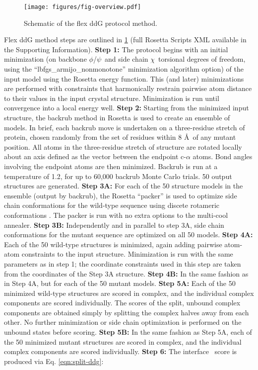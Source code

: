 \begin{figure}
  \centering
  \texttt{[image: figures/fig-overview.pdf]}
    \caption[]{
      Schematic of the flex ddG protocol method.
  } \label{fig:figure-overview}
\end{figure}

Flex ddG method steps are outlined in \cref{fig:figure-overview} (full Rosetta Scripts XML available in the Supporting Information).
\textbf{Step 1:} The protocol begins with an initial minimization (on backbone $\phi$/$\psi$\ and side chain $\chi$\ torsional degrees of freedom, using the ``lbfgs\_armijo\_nonmonotone'' minimization algorithm option) of the input model using the Rosetta energy function. This (and later) minimizations are performed with constraints that harmonically restrain pairwise atom distance to their values in the input crystal structure. Minimization is run until convergence into a local energy well.
\textbf{Step 2:} Starting from the minimized input structure, the backrub method in Rosetta is used to create an ensemble of models. In brief, each backrub move is undertaken on a three-residue stretch of protein, chosen randomly from the set of residues within 8 \AA\ of any mutant position. All atoms in the three-residue stretch of structure are rotated locally about an axis defined as the vector between the endpoint c-$\alpha$ atoms. Bond angles involving the endpoint atoms are then minimized. Backrub is run at a temperature of 1.2, for up to 60,000 backrub Monte Carlo trials. 50 output structures are generated.
\textbf{Step 3A:} For each of the 50 structure models in the ensemble (output by backrub), the Rosetta ``packer'' is used to optimize side chain conformations for the wild-type sequence using discete rotameric conformations \cite{shapovalov_smoothed_2011}. The packer is run with no extra options to the multi-cool annealer\cite{leaver-fay_generic_2011}. %
\textbf{Step 3B:} Independently and in parallel to step 3A, side chain conformations for the mutant sequence are optimized on all 50 models.
\textbf{Step 4A:} Each of the 50 wild-type structures is minimized, again adding pairwise atom-atom constraints to the input structure. Minimization is run with the same parameters as in step 1; the coordinate constraints used in this step are taken from the coordinates of the Step 3A structure.
\textbf{Step 4B:} In the same fashion as in Step 4A, but for each of the 50 mutant models.
\textbf{Step 5A:} Each of the 50 minimized wild-type structures are scored in complex, and the individual complex components are scored individually. The scores of the split, unbound complex components are obtained simply by splitting the complex halves away from each other. No further minimization or side chain optimization is performed on the unbound states before scoring.
\textbf{Step 5B:} In the same fashion as Step 5A, each of the 50 minimized mutant structures are scored in complex, and the individual complex components are scored individually.
\textbf{Step 6:} The interface \ddg\ score is produced via Eq. \ref{eqn:split-ddg}:

